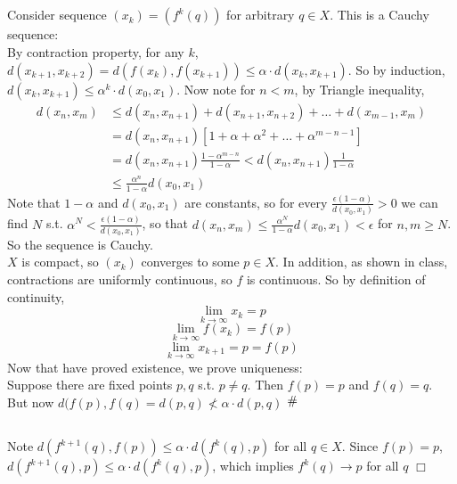 \documentclass{article}
\newcommand{\contra}{\raisebox{\depth}{\#}}
\begin{document}
\subsection{}
Consider sequence $(x_k) = (f^k(q))$ for arbitrary $q \in X$. This is a Cauchy sequence:\\
By contraction property, for any $k$, $d(x_{k+1},x_{k+2}) = d(f(x_{k}),f(x_{k+1})) \leq \alpha \cdot d(x_k,x_{k+1})$. So by induction, $d(x_k,x_{k+1}) \leq \alpha^k \cdot d(x_0,x_1)$. Now note for $n<m$, by Triangle inequality,
\begin{equation*}
    \begin{split}
        d(x_n,x_m) &\leq d(x_n,x_{n+1}) + d(x_{n+1},x_{n+2}) + \dots + d(x_{m-1},x_m)\\
        &= d(x_n,x_{n+1})[1 + \alpha + \alpha^2 + \dots + \alpha^{m-n-1}]\\
        &= d(x_n,x_{n+1}) \frac{1-\alpha^{m-n}}{1-\alpha} < d(x_n,x_{n+1}) \frac{1}{1-\alpha}\\
        &\leq \frac{\alpha^n}{1-\alpha} d(x_0,x_1)
    \end{split}
\end{equation*}
Note that $1 - \alpha$ and $d(x_0,x_1)$ are constants, so for every $\frac{\epsilon (1-\alpha)}{d(x_0,x_1)} > 0$ we can find $N$ s.t. $\alpha^N < \frac{\epsilon (1-\alpha)}{d(x_0,x_1)}$, so that $d(x_n,x_m) \leq \frac{\alpha^N}{1-\alpha} d(x_0,x_1) < \epsilon$ for $n,m \geq N$. So the sequence is Cauchy.\\
$X$ is compact, so $(x_k)$ converges to some $p \in X$. In addition, as shown in class, contractions are uniformly continuous, so $f$ is continuous. So by definition of continuity,
$$\lim\limits_{k\rightarrow\infty} x_k = p$$
$$\lim\limits_{k\rightarrow\infty} f(x_k) = f(p)$$
$$\lim\limits_{k\rightarrow\infty} x_{k+1} = p = f(p)$$
Now that have proved existence, we prove uniqueness:\\
Suppose there are fixed points $p,q$ s.t. $p\neq q$. Then $f(p) =p$ and $f(q)=q$. But now $d(f(p),f(q) = d(p,q) \nless \alpha \cdot d(p,q)$ $\contra$

\subsection{}
Note $d(f^{k+1}(q),f(p)) \leq \alpha\cdot d(f^k(q),p)$ for all $q \in X$. Since $f(p) = p$, $d(f^{k+1}(q),p) \leq \alpha\cdot d(f^k(q),p)$, which implies $f^k(q) \rightarrow p$ for all $q$ $\Box$
\end{document}

